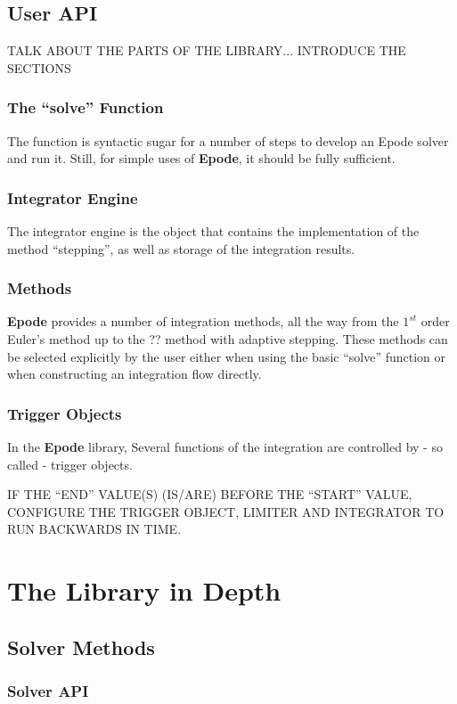\documentclass[letterpaper,10pt]{book}
\newcommand{\epode}[0]{\textbf{Epode}}
\begin{document}
  \chapter{User API}
    TALK ABOUT THE PARTS OF THE LIBRARY... INTRODUCE THE SECTIONS

    \section{The ``solve'' Function}
      The function  is syntactic sugar for a number of steps to develop an Epode solver and run it.  Still, for simple uses of \epode{}, it should be fully sufficient.
      
    \section{Integrator Engine}
      The integrator engine is the object that contains the implementation of the method ``stepping'', as well as storage of the integration results.
      
    \section{Methods}
      \epode{} provides a number of integration methods, all the way from the $1^{st}$ order Euler's method up to the ?? method with adaptive stepping.  These methods can be selected explicitly by the user either when using the basic ``solve'' function or when constructing an integration flow directly.
      
    \section{Trigger Objects}
      In the \epode{} library, Several functions of the integration are controlled by - so called - trigger objects.
      
      IF THE ``END'' VALUE(S) (IS/ARE) BEFORE THE ``START'' VALUE, CONFIGURE THE TRIGGER OBJECT, LIMITER AND INTEGRATOR TO RUN BACKWARDS IN TIME.

\part{The Library in Depth}
  \chapter{Solver Methods}
    \section{Solver API}
\end{document}
